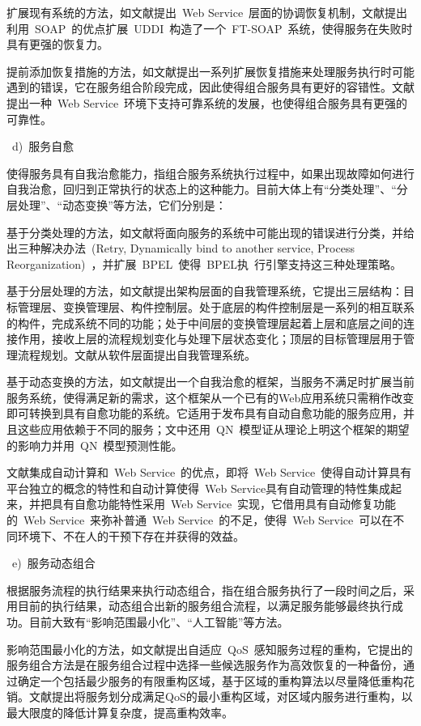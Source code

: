 扩展现有系统的方法，如文献\cite{cabrera2002web}提出~Web Service~层面的协调恢复机制，文献\cite{jeckle2003active}提出利用~SOAP~的优点扩展~UDDI~构造了一个~FT-SOAP~系统，使得服务在失败时具有更强的恢复力。

提前添加恢复措施的方法，如文献\cite{erradi2006recovery}提出一系列扩展恢复措施来处理服务执行时可能遇到的错误，它在服务组合阶段完成，因此使得组合服务具有更好的容错性。文献\cite{issarny2003coordinated}提出一种~Web Service~环境下支持可靠系统的发展，也使得组合服务具有更强的可靠性。

~d)~服务自愈

使得服务具有自我治愈能力，指组合服务系统执行过程中，如果出现故障如何进行自我治愈，回归到正常执行的状态上的这种能力。目前大体上有“分类处理”、“分层处理”、“动态变换”等方法，它们分别是：

基于分类处理的方法，如文献\cite{baresi2004towards}将面向服务的系统中可能出现的错误进行分类，并给出三种解决办法~(Retry, Dynamically bind to another service,  Process Reorganization)~，并扩展~BPEL~使得~BPEL执~行引擎支持这三种处理策略。

基于分层处理的方法，如文献\cite{kramer2007self}提出架构层面的自我管理系统，它提出三层结构：目标管理层、变换管理层、构件控制层。处于底层的构件控制层是一系列的相互联系的构件，完成系统不同的功能；处于中间层的变换管理层起着上层和底层之间的连接作用，接收上层的流程规划变化与处理下层状态变化；顶层的目标管理层用于管理流程规划。文献\cite{garlan2002model}从软件层面提出自我管理系统。

基于动态变换的方法，如文献\cite{naccache2007self}提出一个自我治愈的框架，当服务不满足时扩展当前服务系统，使得满足新的需求，这个框架从一个已有的Web应用系统只需稍作改变即可转换到具有自愈功能的系统。它适用于发布具有自动自愈功能的服务应用，并且这些应用依赖于不同的服务；文中还用~QN~模型证从理论上明这个框架的期望的影响力并用~QN~模型预测性能。

文献\cite{gurguis2005towards}集成自动计算和~Web Service~的优点，即将~Web Service~使得自动计算具有平台独立的概念的特性和自动计算使得~Web Service具有自动管理的特性集成起来，并把具有自愈功能特性采用~Web Service~实现，它借用具有自动修复功能的~Web Service~来弥补普通~Web Service~的不足，使得~Web Service~可以在不同环境下、不在人的干预下存在并获得的效益。

~e)~服务动态组合

根据服务流程的执行结果来执行动态组合，指在组合服务执行了一段时间之后，采用目前的执行结果，动态组合出新的服务组合流程，以满足服务能够最终执行成功。目前大致有“影响范围最小化”、“人工智能”等方法。

影响范围最小化的方法，如文献\cite{li2011adaptive}提出自适应~QoS~感知服务过程的重构，它提出的服务组合方法是在服务组合过程中选择一些候选服务作为高效恢复的一种备份，通过确定一个包括最少服务的有限重构区域，基于区域的重构算法以尽量降低重构花销。文献\cite{lin2009efficient}提出将服务划分成满足QoS的最小重构区域，对区域内服务进行重构，以最大限度的降低计算复杂度，提高重构效率。

